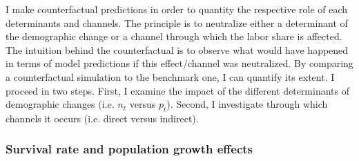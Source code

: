 I make counterfactual predictions in order to quantity the respective role of each determinants and channels. The principle is to neutralize either a determinant of the demographic change or a channel through which the labor share is affected. The intuition behind the counterfactual is to observe what would have happened in terms of model predictions if this effect/channel was neutralized. By comparing a counterfactual simulation to the benchmark one, I can quantify its extent. I proceed in two steps. First, I examine the impact of the different determinants of demographic changes (i.e. $n_t$ versus $p_t$). Second, I investigate through which channels it occurs (i.e. direct versus indirect).

\subsubsection{Survival rate and population growth effects}

